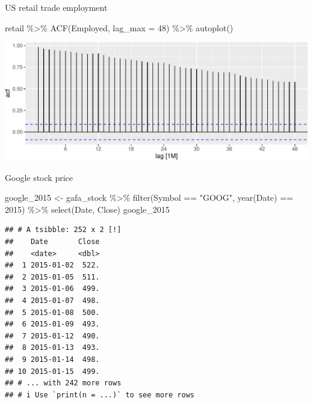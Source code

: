 \documentclass[14pt,ignorenonframetext,aspectratio=169]{beamer}
\newenvironment{Shaded}{\begin{snugshade}}{\end{snugshade}}
\newcommand{\AttributeTok}[1]{\textcolor[rgb]{0.77,0.63,0.00}{#1}}
\newcommand{\DecValTok}[1]{\textcolor[rgb]{0.00,0.00,0.81}{#1}}
\newcommand{\FunctionTok}[1]{\textcolor[rgb]{0.00,0.00,0.00}{#1}}
\newcommand{\NormalTok}[1]{#1}
\newcommand{\OtherTok}[1]{\textcolor[rgb]{0.56,0.35,0.01}{#1}}
\newcommand{\SpecialCharTok}[1]{\textcolor[rgb]{0.00,0.00,0.00}{#1}}
\newcommand{\StringTok}[1]{\textcolor[rgb]{0.31,0.60,0.02}{#1}}
\renewenvironment{Shaded}{\color{black}\begin{snugshade}\color{black}}{\end{snugshade}}
\renewenvironment{Shaded}{\color{black}\fontsize{10}{10}\sf\begin{snugshade}\color{black}}{\end{snugshade}}
\begin{document}
\begin{frame}[fragile]{US retail trade employment}
\protect\hypertarget{us-retail-trade-employment-1}{}
\fontsize{10}{10}\sf

\begin{Shaded}
\begin{Highlighting}[]
\NormalTok{retail }\SpecialCharTok{\%\textgreater{}\%}
  \FunctionTok{ACF}\NormalTok{(Employed, }\AttributeTok{lag\_max =} \DecValTok{48}\NormalTok{) }\SpecialCharTok{\%\textgreater{}\%}
  \FunctionTok{autoplot}\NormalTok{()}
\end{Highlighting}
\end{Shaded}

\includegraphics{2-tsgraphics_files/figure-beamer/unnamed-chunk-27-1.pdf}
\end{frame}

\begin{frame}[fragile]{Google stock price}
\protect\hypertarget{google-stock-price}{}
\fontsize{10}{10}\sf

\begin{Shaded}
\begin{Highlighting}[]
\NormalTok{google\_2015 }\OtherTok{\textless{}{-}}\NormalTok{ gafa\_stock }\SpecialCharTok{\%\textgreater{}\%}
  \FunctionTok{filter}\NormalTok{(Symbol }\SpecialCharTok{==} \StringTok{"GOOG"}\NormalTok{, }\FunctionTok{year}\NormalTok{(Date) }\SpecialCharTok{==} \DecValTok{2015}\NormalTok{) }\SpecialCharTok{\%\textgreater{}\%}
  \FunctionTok{select}\NormalTok{(Date, Close)}
\NormalTok{google\_2015}
\end{Highlighting}
\end{Shaded}

\begin{verbatim}
## # A tsibble: 252 x 2 [!]
##    Date       Close
##    <date>     <dbl>
##  1 2015-01-02  522.
##  2 2015-01-05  511.
##  3 2015-01-06  499.
##  4 2015-01-07  498.
##  5 2015-01-08  500.
##  6 2015-01-09  493.
##  7 2015-01-12  490.
##  8 2015-01-13  493.
##  9 2015-01-14  498.
## 10 2015-01-15  499.
## # ... with 242 more rows
## # i Use `print(n = ...)` to see more rows
\end{verbatim}
\end{frame}
\end{document}

